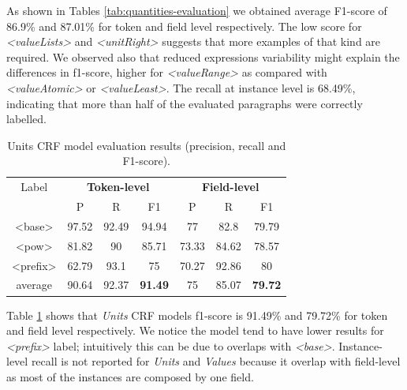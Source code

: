 \documentclass[sigconf]{acmart}
\begin{document}
As shown in Tables \ref{tab:quantities-evaluation} we obtained average F1-score of 86.9\% and 87.01\% for token and field level respectively. The low score for \textit{<valueLists>} and \textit{<unitRight>} suggests that more examples of that kind are required.  We observed also that reduced expressions variability might explain the differences in f1-score, higher for \textit{<valueRange>} as  compared with \textit{<valueAtomic>} or \textit{<valueLeast>}. The recall at instance level is 68.49\%, indicating that more than half of the evaluated paragraphs were correctly labelled.  

\begin{table}[ht]
    \caption{Units CRF model evaluation results (precision, recall and F1-score).}
    \label{tab:units-evaluation}
    \begin{tabular}{c|ccc|ccc}
        \toprule
        Label & \multicolumn{3}{c}{\textbf{Token-level}} & \multicolumn{3}{c}{\textbf{Field-level}}\\
        & P & R & F1 & P & R & F1 \\
        \midrule
        <base>    & 97.52 & 92.49 & 94.94 & 77    & 82.8  & 79.79 \\
        <pow>     & 81.82 & 90    & 85.71 & 73.33 & 84.62 & 78.57 \\
        <prefix>  & 62.79 & 93.1  & 75    & 70.27 & 92.86 & 80    \\
        \midrule
        average   & 90.64  & 92.37 & \textbf{91.49} & 75   & 85.07 & \textbf{79.72} \\
        \bottomrule
   \end{tabular}
\end{table}

Table \ref{tab:units-evaluation} shows that \textit{Units} CRF models f1-score is 91.49\% and 79.72\% for token and field level respectively. We notice the model tend to have lower results for \textit{<prefix>} label; intuitively this can be due to overlaps with \textit{<base>}. Instance-level recall is not reported for \textit{Units} and \textit{Values} because it overlap with field-level as most of the instances are composed by one field. 
\end{document}
